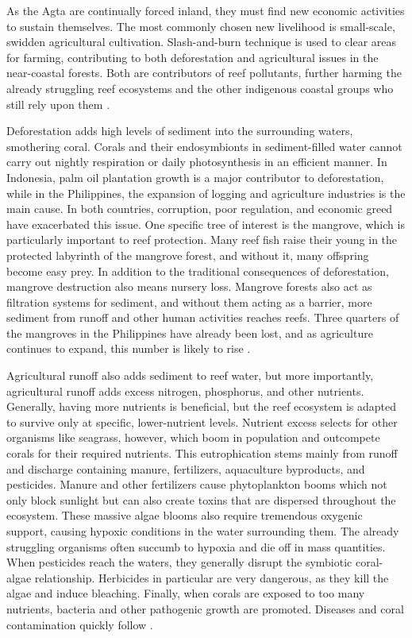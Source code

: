 \documentclass{book}\usepackage{knitr}
\begin{document}
As the Agta are continually forced inland, they must find new economic activities to sustain themselves. The most commonly chosen new livelihood is small-scale, swidden agricultural cultivation. Slash-and-burn technique is used to clear areas for farming, contributing to both deforestation and agricultural issues in the near-coastal forests. Both are contributors of reef pollutants, further harming the already struggling reef ecosystems and the other indigenous coastal groups who still rely upon them \citep{RePEc:gam:jsusta:v:12:y:2020:i:19:p:7983-:d:420111}.

Deforestation adds high levels of sediment into the surrounding waters, smothering coral. Corals and their endosymbionts in sediment-filled water cannot carry out nightly respiration or daily photosynthesis in an efficient manner. In Indonesia, palm oil plantation growth is a major contributor to deforestation, while in the Philippines, the expansion of logging and agriculture industries is the main cause. In both countries, corruption, poor regulation, and economic greed have exacerbated this issue. One specific tree of interest is the mangrove, which is particularly important to reef protection. Many reef fish raise their young in the protected labyrinth of the mangrove forest, and without it, many offspring become easy prey. In addition to the traditional consequences of deforestation, mangrove destruction also means nursery loss. Mangrove forests also act as filtration systems for sediment, and without them acting as a barrier, more sediment from runoff and other human activities reaches reefs. Three quarters of the mangroves in the Philippines have already been lost, and as agriculture continues to expand, this number is likely to rise \citep{coralreefalliance_2021}.

	Agricultural runoff also adds sediment to reef water, but more importantly, agricultural runoff adds excess nitrogen, phosphorus, and other nutrients. Generally, having more nutrients is beneficial, but the reef ecosystem is adapted to survive only at specific, lower-nutrient levels. Nutrient excess selects for other organisms like seagrass, however, which boom in population and outcompete corals for their required nutrients. This eutrophication stems mainly from runoff and discharge containing manure, fertilizers, aquaculture byproducts, and pesticides. Manure and other fertilizers cause phytoplankton booms which not only block sunlight but can also create toxins that are dispersed throughout the ecosystem. These massive algae blooms also require tremendous oxygenic support, causing hypoxic conditions in the water surrounding them. The already struggling organisms often succumb to hypoxia and die off in mass quantities. When pesticides reach the waters, they generally disrupt the symbiotic coral-algae relationship. Herbicides in particular are very dangerous, as they kill the algae and induce bleaching. Finally, when corals are exposed to too many nutrients, bacteria and other pathogenic growth are promoted. Diseases and coral contamination quickly follow \citep{4884777420100401}.
\end{document}
